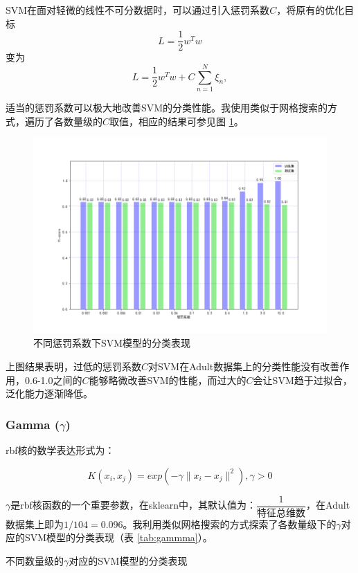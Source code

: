 \documentclass[12pt,a4paper]{article}
\theoremstyle{definition}
\begin{document}
{SVM在面对轻微的线性不可分数据时，可以通过引入惩罚系数$C$，将原有的优化目标
\begin{equation}
	L = \dfrac{1}{2}w^Tw
\end{equation}
变为
\begin{equation}
	L = \dfrac{1}{2}w^Tw+C\sum\limits_{n=1}^{N}\xi_n,
\end{equation}

适当的惩罚系数可以极大地改善SVM的分类性能。我使用类似于网格搜索的方式，遍历了各数量级的$C$取值，相应的结果可参见图 \ref{fig:penalty}。

\begin{figure}[H]
	\centering
	\includegraphics[width=0.75\linewidth]{img/svm_penalty.png}
	\caption{不同惩罚系数下SVM模型的分类表现}
	\label{fig:penalty}
\end{figure}

上图结果表明，过低的惩罚系数$C$对SVM在Adult数据集上的分类性能没有改善作用，0.6-1.0之间的$C$能够略微改善SVM的性能，而过大的$C$会让SVM趋于过拟合，泛化能力逐渐降低。

\subsubsection{Gamma ($\gamma$)}

rbf核的数学表达形式为：

\begin{equation}
	K(x_i, x_j)=exp(-\gamma\|x_i-x_j\|^2), \gamma>0
\end{equation}

$\gamma$是rbf核函数的一个重要参数，在sklearn中，其默认值为：$\dfrac{1}{\mbox{特征总维数}}$，在Adult数据集上即为$1/104=0.096$。我利用类似网格搜索的方式探索了各数量级下的$\gamma$对应的SVM模型的分类表现（表 \ref{tab:gammma}）。

\begin{table}[H]
	\renewcommand\arraystretch{1.35}
	\caption{不同数量级的$\gamma$对应的SVM模型的分类表现}
	\label{tab:gammma}
	\centering
	

\end{table}}
\end{document}
